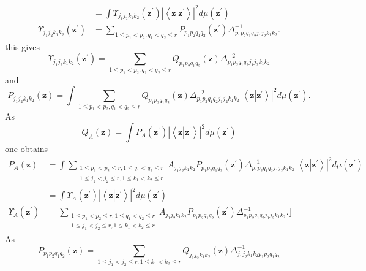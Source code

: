 \documentclass[aps,preprint]{revtex4}%
\begin{document}
\begin{align}
&  =\int\Upsilon_{j_{1}j_{2}k_{1}k_{2}}\left(  \mathbf{z}^{\prime}\right)
\left\vert \left\langle \mathbf{z}\left\vert \mathbf{z}^{\prime}\right.
\right\rangle \right\vert ^{2}d\mu\left(  \mathbf{z}^{\prime}\right)
\nonumber\\
\Upsilon_{j_{1}j_{2}k_{1}k_{2}}\left(  \mathbf{z}^{\prime}\right)   &
=\sum_{1\leq p_{1}<p_{2},q_{1}<q_{2}\leq r}P_{p_{1}p_{2}q_{1}q_{2}}\left(
\mathbf{z}^{\prime}\right)  \Delta_{p_{1}p_{2}q_{1}q_{2}j_{1}j_{2}k_{1}k_{2}%
}^{-1}.
\end{align}
this gives%
\begin{equation}
\Upsilon_{j_{1}j_{2}k_{1}k_{2}}\left(  \mathbf{z}^{\prime}\right)
=\sum_{1\leq p_{1}<p_{2},q_{1}<q_{2}\leq r}Q_{p_{1}p_{2}q_{1}q_{2}}\left(
\mathbf{z}\right)  \Delta_{p_{1}p_{2}q_{1}q_{2}j_{1}j_{2}k_{1}k_{2}}^{-2}%
\end{equation}
and
\begin{equation}
P_{j_{1}j_{2}k_{1}k_{2}}\left(  \mathbf{z}\right)  =\int\sum_{1\leq
p_{1}<p_{2},q_{1}<q_{2}\leq r}Q_{p_{1}p_{2}q_{1}q_{2}}\left(  \mathbf{z}%
\right)  \Delta_{p_{1}p_{2}q_{1}q_{2}j_{1}j_{2}k_{1}k_{2}}^{-2}\left\vert
\left\langle \mathbf{z}\left\vert \mathbf{z}^{\prime}\right.  \right\rangle
\right\vert ^{2}d\mu\left(  \mathbf{z}^{\prime}\right)  .
\end{equation}
As%
\begin{equation}
Q_{A}\left(  \mathbf{z}\right)  =\int P_{A}\left(  \mathbf{z}^{\prime}\right)
\left\vert \left\langle \mathbf{z}\left\vert \mathbf{z}^{\prime}\right.
\right\rangle \right\vert ^{2}d\mu\left(  \mathbf{z}^{\prime}\right)
\end{equation}
one obtains%
\begin{align}
P_{A}\left(  \mathbf{z}\right)   &  =\int\sum_{\substack{1\leq p_{1}<p_{2}\leq
r,1\leq q_{1}<q_{2}\leq r\\1\leq j_{1}<j_{2}\leq r,1\leq k_{1}<k_{2}\leq
r}}A_{j_{1}j_{2}k_{1}k_{2}}P_{p_{1}p_{2}q_{1}q_{2}}\left(  \mathbf{z}^{\prime
}\right)  \Delta_{p_{1}p_{2}q_{1}q_{2}j_{1}j_{2}k_{1}k_{2}}^{-1}\left\vert
\left\langle \mathbf{z}\left\vert \mathbf{z}^{\prime}\right.  \right\rangle
\right\vert ^{2}d\mu\left(  \mathbf{z}^{\prime}\right) \nonumber\\
&  =\int\Upsilon_{A}\left(  \mathbf{z}^{\prime}\right)  \left\vert
\left\langle \mathbf{z}\left\vert \mathbf{z}^{\prime}\right.  \right\rangle
\right\vert ^{2}d\mu\left(  \mathbf{z}^{\prime}\right) \nonumber\\
\Upsilon_{A}\left(  \mathbf{z}^{\prime}\right)   &  =\sum_{\substack{1\leq
p_{1}<p_{2}\leq r,1\leq q_{1}<q_{2}\leq r\\1\leq j_{1}<j_{2}\leq r,1\leq
k_{1}<k_{2}\leq r}}A_{j_{1}j_{2}k_{1}k_{2}}P_{p_{1}p_{2}q_{1}q_{2}}\left(
\mathbf{z}^{\prime}\right)  \Delta_{p_{1}p_{2}q_{1}q_{2}j_{1}j_{2}k_{1}k_{2}%
}^{-1}.\rfloor
\end{align}
As%
\begin{equation}
P_{p_{1}p_{2}q_{1}q_{2}}\left(  \mathbf{z}\right)  =\sum_{1\leq j_{1}%
<j_{2}\leq r,1\leq k_{1}<k_{2}\leq r}Q_{j_{1}j_{2}k_{1}k_{2}}\left(
\mathbf{z}\right)  \Delta_{j_{1}j_{2}k_{1}k_{2}p_{1}p_{2}q_{1}q_{2}}%
^{-1}\nonumber
\end{equation}
%
\end{document}

